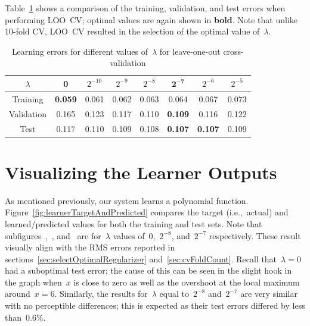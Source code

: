\documentclass{report}
\begin{document}
  Table~\ref{tab:lambdaLooError} shows a comparison of the training, validation, and test errors when performing LOO~CV; optimal values are again shown in \textbf{bold}.  Note that unlike $10$-fold CV, LOO~CV resulted in the selection of the optimal value of~$\lambda$.
  
   \begin{table}[tb]
    \centering
    \caption{Learning errors for different values of~$\lambda$ for leave-one-out cross-validation}\label{tab:lambdaLooError}
    \begin{tabular}{c||c|c|c|c|c|c|c}
      \hline
      $\lambda$  & 0     & $2^{-10}$ & $2^{-9}$ & $2^{-8}$ & $\mathbf{2^{-7}}$ & $2^{-6}$ & $2^{-5}$ \\ \hline\hline
      Training   & \textbf{0.059} & 0.061      & 0.062     & 0.063     & 0.064          & 0.067    & 0.073   \\ \hline
      Validation & 0.165          & 0.123      & 0.117     & 0.110     & \textbf{0.109} & 0.116    & 0.122   \\ \hline
      Test       & 0.117          & 0.110      & 0.109     & 0.108     & \textbf{0.107} & \textbf{0.107}    & 0.109   \\ \hline
    \end{tabular}
  \end{table}

  
  \section{Visualizing the Learner Outputs}
  
  As mentioned previously, our system learns a polynomial function.  Figure~\ref{fig:learnerTargetAndPredicted} compares the target (i.e.,~actual) and learned/predicted values for both the training and test sets.  Note that subfigures~,~, and~ are for~$\lambda$ values of~$0$,~$2^{-8}$, and~$2^{-7}$ respectively.  These result visually align with the RMS errors reported in sections~\ref{sec:selectOptimalRegularizer} and~\ref{sec:cvFoldCount}.  Recall that~${\lambda=0}$ had a suboptimal test error; the cause of this can be seen in the slight hook in the graph when~$x$ is close to zero as well as the overshoot at the local maximum around~${x=6}$.  Similarly, the results for~$\lambda$ equal to~$2^{-8}$ and~$2^{-7}$ are very similar with no perceptible differences; this is expected as their test errors differed by less than~$0.6\%$.
  
\end{document}
